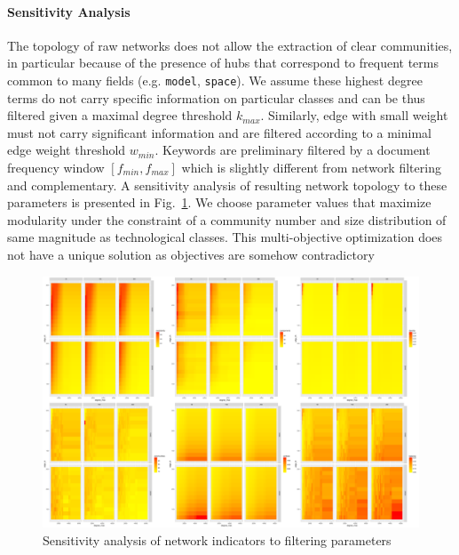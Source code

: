 \paragraph{Sensitivity Analysis}



The topology of raw networks does not allow the extraction of clear communities, in particular because of the presence of hubs that correspond to frequent terms common to many fields (e.g. \texttt{model}, \texttt{space}). We assume these highest degree terms do not carry specific information on particular classes and can be thus filtered given a maximal degree threshold $k_{max}$. Similarly, edge with small weight must not carry significant information and are filtered according to a minimal edge weight threshold $w_{min}$. Keywords are preliminary filtered by a document frequency window $\left[ f_{min},f_{max} \right]$ which is slightly different from network filtering and complementary. A sensitivity analysis of resulting network topology to these parameters is presented in Fig.~\ref{fig:sensitivity}. We choose parameter values that maximize modularity under the constraint of a community number and size distribution of same magnitude as technological classes. This multi-objective optimization does not have a unique solution as objectives are somehow contradictory





\begin{figure}
\centering
\includegraphics[width=\textwidth]{figures/sensitivity_facet_allindics}
\caption{Sensitivity analysis of network indicators to filtering parameters}
\label{fig:sensitivity}
\end{figure}






